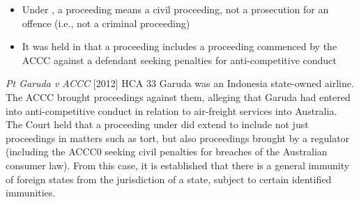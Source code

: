 \begin{itemize}
    \item Under , a proceeding means a civil proceeding, not a prosecution for an offence (i.e., not a criminal proceeding)
    \item It was held in  that a proceeding includes a proceeding commenced by the ACCC against a defendant seeking penalties for anti-competitive conduct
\end{itemize}

\begin{casedetails}{\textit{Pt Garuda v ACCC} [2012] HCA 33}
    \flushleft
    Garuda was an Indonesia state-owned airline. The ACCC brought proceedings against them, alleging that Garuda had entered into anti-competitive conduct in relation to air-freight services into Australia. The Court held that a proceeding under  did extend to include not just proceedings in matters such as tort, but also proceedings brought by a regulator (including the ACCC0 seeking civil penalties for breaches of the Australian consumer law). From this case, it is established that there is a general immunity of foreign states from the jurisdiction of a state, subject to certain identified immunities.
\end{casedetails}

